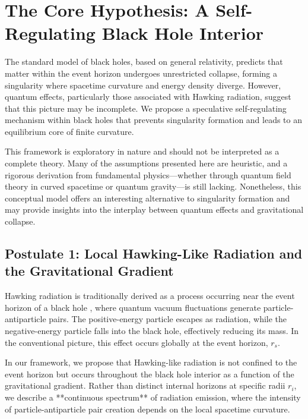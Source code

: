 \section{The Core Hypothesis: A Self-Regulating Black Hole Interior}
\label{sec:core_hypothesis}

The standard model of black holes, based on general relativity, predicts that matter within the event horizon undergoes unrestricted collapse, forming a singularity where spacetime curvature and energy density diverge. However, quantum effects, particularly those associated with Hawking radiation, suggest that this picture may be incomplete. We propose a speculative self-regulating mechanism within black holes that prevents singularity formation and leads to an equilibrium core of finite curvature.

This framework is exploratory in nature and should not be interpreted as a complete theory. Many of the assumptions presented here are heuristic, and a rigorous derivation from fundamental physics—whether through quantum field theory in curved spacetime or quantum gravity—is still lacking. Nonetheless, this conceptual model offers an interesting alternative to singularity formation and may provide insights into the interplay between quantum effects and gravitational collapse.

\subsection{Postulate 1: Local Hawking-Like Radiation and the Gravitational Gradient}

Hawking radiation is traditionally derived as a process occurring near the event horizon of a black hole \cite{hawking1975particle}, where quantum vacuum fluctuations generate particle-antiparticle pairs. The positive-energy particle escapes as radiation, while the negative-energy particle falls into the black hole, effectively reducing its mass. In the conventional picture, this effect occurs globally at the event horizon, \( r_s \).

In our framework, we propose that Hawking-like radiation is not confined to the event horizon but occurs throughout the black hole interior as a function of the gravitational gradient. Rather than distinct internal horizons at specific radii \( r_i \), we describe a **continuous spectrum** of radiation emission, where the intensity of particle-antiparticle pair creation depends on the local spacetime curvature.


